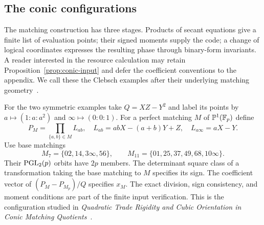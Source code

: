 \subsection{The conic configurations}
The matching construction has three stages. Products of secant equations give
a finite list of evaluation points; their signed moments supply the code; a
change of logical coordinates expresses the resulting phase through binary-form
invariants. A reader interested in the resource calculation may retain
Proposition~\ref{prop:conic-input} and defer the coefficient conventions to the
appendix. We call these the Clebsch examples after their underlying matching
geometry~\cite{tradegeometry}.

For the two symmetric examples take $Q=XZ-Y^2$ and label its points by
$a\mapsto(1:a:a^2)$ and $\infty\mapsto(0:0:1)$.
For a perfect matching $M$ of $\mathbb P^1(\mathbb F_p)$ define
\[
 P_M=\prod_{\{a,b\}\in M}L_{ab},\quad
 L_{ab}=abX-(a+b)Y+Z,\quad L_{a\infty}=aX-Y.
\]
Use base matchings
\[
 M_7=\{02,14,3\infty,56\},\qquad
 M_{11}=\{01,25,37,49,68,10\infty\}.
\]
Their $\operatorname{PGL}_2(p)$ orbits have $2p$ members. The determinant square class
of a transformation taking the base matching to $M$ specifies its sign.
The coefficient vector of $(P_M-P_{M_p})/Q$ specifies $x_M$.
The exact division, sign consistency, and moment conditions are part of the
finite input verification. This is the configuration studied in
\emph{Quadratic Trade Rigidity and Cubic Orientation in Conic Matching
Quotients}~\cite{tradegeometry}.

